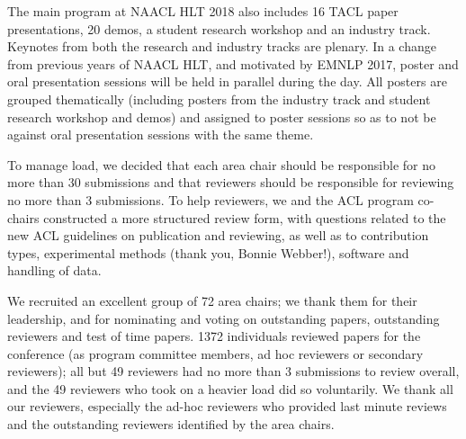 

The main program at NAACL HLT 2018 also includes 16 TACL paper presentations, 20 demos, a student research workshop and an industry track. Keynotes from both the research and industry tracks are plenary. In a change from previous years of NAACL HLT, and motivated by EMNLP 2017, poster and oral presentation sessions will be held in parallel during the day. All posters are grouped thematically (including posters from the industry track and student research workshop and demos) and assigned to poster sessions so as to not be against oral presentation sessions with the same theme. 


 To manage load, we decided that each area chair should be responsible for no more than 30 submissions and that reviewers should be responsible for reviewing no more than 3 submissions. To help reviewers, we and the ACL program co-chairs constructed a more structured review form, with questions related to the new ACL guidelines on publication and reviewing, as well as to contribution types, experimental methods (thank you, Bonnie Webber!), software and handling of data. 

We recruited an excellent group of 72 area chairs; we thank them for their leadership, and for nominating and voting on outstanding papers, outstanding reviewers and test of time papers. 1372 individuals reviewed papers for the conference (as program committee members, ad hoc reviewers or secondary reviewers); all but 49 reviewers had no more than 3 submissions to review overall, and the 49 reviewers who took on a heavier load did so voluntarily. We thank all our reviewers, especially the ad-hoc reviewers who provided last minute reviews and the outstanding reviewers identified by the area chairs.

